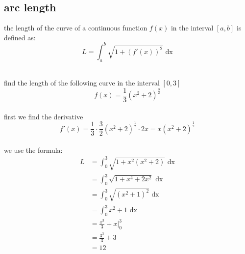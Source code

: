 \documentclass[a4paper,12pt]{article}
\newcommand{\?}{\stackrel{?}{=}}
\begin{document}
\subsection{arc length}
\label{sec:org8075c71}
\begin{definition}
the length of the curve of a continuous function \(f(x)\) in the interval \([a,b]\) is defined as:\\[0pt]
\[
  L = \int_a^b \sqrt{1+(f'(x))^2} \text{ dx}
\]\\[0pt]
\begin{my_example}
find the length of the following curve in the interval \([0,3]\)\\[0pt]
\[
  f(x) = \frac13{(x^2+2)}^{\frac32}
\]\\[0pt]
first we find the derivative\\[0pt]
\[
  f'(x) = \frac13 \cdot \frac32{(x^2+2)}^{\frac12} \cdot 2x = x{(x^2+2)}^{\frac12}
\]\\[0pt]
we use the formula:\\[0pt]
\begin{align*}
  L &= \int_0^3 \sqrt{1+x^2(x^2+2)} \text{ dx}\\
  &= \int_0^3 \sqrt{1+x^4+2x^2} \text{ dx}\\
  &= \int_0^3 \sqrt{{(x^2+1)}^{2}} \text{ dx}\\
  &= \int_0^3 x^2+1 \text{ dx}\\
  &= \frac{x^3}{3}+x \Big|_0^3\\
  &= \frac{3^3}{3}+3\\
  &= 12
\end{align*}
\end{my_example}


\end{definition}
\end{document}
